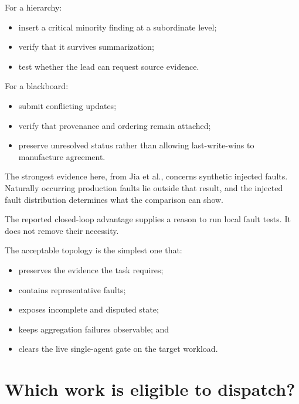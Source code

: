 
For a hierarchy:

\begin{itemize}
\tightlist
\item
  insert a critical minority finding at a subordinate level;
\item
  verify that it survives summarization;
\item
  test whether the lead can request source evidence.
\end{itemize}


For a blackboard:

\begin{itemize}
\tightlist
\item
  submit conflicting updates;
\item
  verify that provenance and ordering remain attached;
\item
  preserve unresolved status rather than allowing last-write-wins to manufacture agreement.
\end{itemize}

The strongest evidence here, from Jia et al., concerns synthetic injected faults. Naturally occurring production faults lie outside that result, and the injected fault distribution determines what the comparison can show.

The reported closed-loop advantage supplies a reason to run local fault tests. It does not remove their necessity.


The acceptable topology is the simplest one that:

\begin{itemize}
\tightlist
\item
  preserves the evidence the task requires;
\item
  contains representative faults;
\item
  exposes incomplete and disputed state;
\item
  keeps aggregation failures observable; and
\item
  clears the live single-agent gate on the target workload.
\end{itemize}

\hypertarget{which-work-is-eligible-to-dispatch}{%
\section{Which work is eligible to dispatch?}\label{which-work-is-eligible-to-dispatch}}

